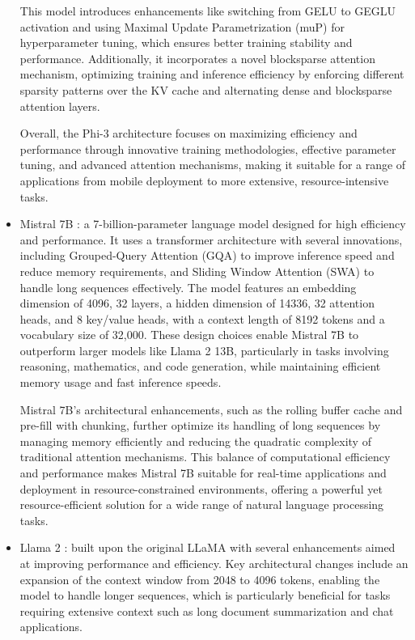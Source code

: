 \documentclass[conference]{IEEEtran}
\begin{document}
\begin{itemize}
This model introduces enhancements like switching from GELU to GEGLU activation and using Maximal Update Parametrization (muP) for hyperparameter tuning, which ensures better training stability and performance. Additionally, it incorporates a novel blocksparse attention mechanism, optimizing training and inference efficiency by enforcing different sparsity patterns over the KV cache and alternating dense and blocksparse attention layers.

Overall, the Phi-3 architecture focuses on maximizing efficiency and performance through innovative training methodologies, effective parameter tuning, and advanced attention mechanisms, making it suitable for a range of applications from mobile deployment to more extensive, resource-intensive tasks.

\item Mistral 7B \cite{jiang2023mistral}: a 7-billion-parameter language model designed for high efficiency and performance. It uses a transformer architecture with several innovations, including Grouped-Query Attention (GQA) to improve inference speed and reduce memory requirements, and Sliding Window Attention (SWA) to handle long sequences effectively. The model features an embedding dimension of 4096, 32 layers, a hidden dimension of 14336, 32 attention heads, and 8 key/value heads, with a context length of 8192 tokens and a vocabulary size of 32,000. These design choices enable Mistral 7B to outperform larger models like Llama 2 13B, particularly in tasks involving reasoning, mathematics, and code generation, while maintaining efficient memory usage and fast inference speeds.

Mistral 7B's architectural enhancements, such as the rolling buffer cache and pre-fill with chunking, further optimize its handling of long sequences by managing memory efficiently and reducing the quadratic complexity of traditional attention mechanisms. This balance of computational efficiency and performance makes Mistral 7B suitable for real-time applications and deployment in resource-constrained environments, offering a powerful yet resource-efficient solution for a wide range of natural language processing tasks.

\item Llama 2 \cite{touvron2023llamatwo}: built upon the original LLaMA \cite{touvron2023llama} with several enhancements aimed at improving performance and efficiency. Key architectural changes include an expansion of the context window from 2048 to 4096 tokens, enabling the model to handle longer sequences, which is particularly beneficial for tasks requiring extensive context such as long document summarization and chat applications.


\end{itemize}
\end{document}

